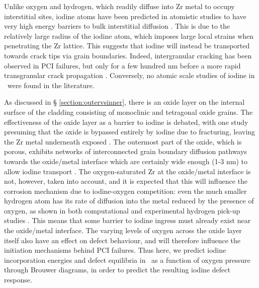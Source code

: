 Unlike oxygen and hydrogen, which readily diffuse into Zr metal to occupy interstitial sites, iodine atoms have been predicted in atomistic studies to have very high energy barriers to bulk interstitial diffusion \cite{rossi2015first,legris2005ab,carlot2002energetically}. This is due to the relatively large radius of the iodine atom, which imposes large local strains when penetrating the Zr lattice. This suggests that iodine will instead be transported towards crack tips via grain boundaries. Indeed, intergranular cracking has been observed in PCI failures, but only for a few hundred nm before a more rapid transgranular crack propagation \cite{fregonese2000failure}. Conversely, no atomic scale studies of iodine in \zirconia\ were found in the literature.  

As discussed in § \ref{section:outervsinner}, there is an oxide layer on the internal surface of the cladding consisting of monoclinic and tetragonal oxide grains. The effectiveness of the oxide layer as a barrier to iodine is debated, with one study presuming that the oxide is bypassed entirely by iodine due to fracturing, leaving the Zr metal underneath exposed \cite{rossi2015first}. The outermost part of the oxide, which is porous, exhibits networks of interconnected grain boundary diffusion pathways towards the oxide/metal interface which are certainly wide enough (1-3 nm) to allow iodine transport \cite{ni2010porosity}. The oxygen-saturated Zr at the oxide/metal interface is not, however, taken into account, and it is expected that this will influence the corrosion mechanism due to iodine-oxygen competition: even the much smaller hydrogen atom has its rate of diffusion into the metal reduced by the presence of oxygen, as shown in both computational \cite{glazoff2014oxidation} and experimental hydrogen pick-up studies \cite{couet2014hydrogen}. This means that some barrier to iodine ingress must already exist near the oxide/metal interface. The varying levels of oxygen across the oxide layer itself also have an effect on defect behaviour, and will therefore influence the initiation mechanisms behind PCI failures. Thus here, we predict iodine incorporation energies and defect equilibria in \zirconia\ as a function of oxygen pressure through Brouwer diagrams, in order to predict the resulting iodine defect response.


%
%


